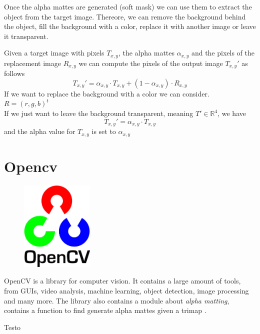 \documentclass[a4paper]{article}
\begin{document}
Once the alpha mattes are generated (soft mask) we can use them
to extract the object from the target image.
Thereore, we can remove the background behind the object,
fill the background with a color, replace it with another image
or leave it transparent.

Given a target image with pixels \(T_{x,y}\), the alpha
mattes \(\alpha_{x,y}\) and the pixels of the replacement image
\(R_{x,y}\) we can compute the pixels of the output image \(T_{x,y}'\)
as follows
\[
    T_{x,y}' = 
    \alpha_{x,y} \cdot T_{x,y} + (1 - \alpha_{x,y}) \cdot R_{x,y}
\]
If we want to replace the background with a color we can consider.
\(R={(r,g,b)}^t\) \\
If we just want to leave the background transparent, meaning
\(T' \in {\mathbb{R}}^4\), we have
\[
    T_{x,y}' = 
    \alpha_{x,y} \cdot T_{x,y}
\]
and the alpha value for \(T_{x,y}\) is set to \(\alpha_{x,y}\)

\pagebreak

\section{Opencv}

\begin{figure}
    \includegraphics[width=3.5cm]{opencvlogo.png}
\end{figure}

OpenCV\cite{opencv} is a library
for computer vision. It contains a large
amount of tools, from GUIs, video analysis, machine learning,
object detection, image processing and many more\cite{opencvdoc}.
The library also contains a module about \textit{alpha matting},
contains a function to find generate alpha mattes given a trimap
\cite{opencvalphamatting}.

\wrapfill

Testo

\pagebreak

\listoffigures

\pagebreak

\nocite{*} %

\printbibliography
\end{document}
